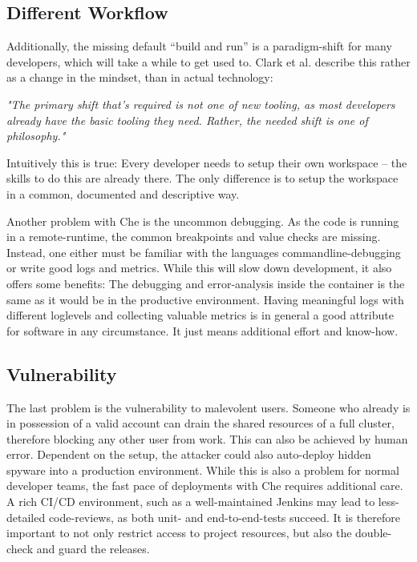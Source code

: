 \documentclass[utf8]{lni}
\begin{document}
\subsection{Different Workflow}
Additionally, the missing default “build and run” is a paradigm-shift for many developers, which will take a while to get used to. 
Clark et al. \cite{CL14} describe this rather as a change in the mindset, than in actual technology: 

\begin{centering}
	\textit{"The primary shift that’s required is not one of new tooling, as most developers already have the basic tooling they need.\newline 
	Rather, the needed shift is one of philosophy."}
\end{centering}

Intuitively this is true: Every developer needs to setup their own workspace – the skills to do this are already there. 
The only difference is to setup the workspace in a common, documented and descriptive way. 

Another problem with Che is the uncommon debugging. 
As the code is running in a remote-runtime, the common breakpoints  and  value checks are missing.  
Instead,  one  either must be familiar with the languages commandline-debugging or write good logs and metrics. 
While this will slow down development, it also offers some benefits: 
The debugging and error-analysis inside the container is the same as it would be in the productive environment. 
Having meaningful logs with different loglevels and collecting valuable metrics is in general a good attribute for software in any circumstance. 
It just means additional effort and know-how.  

\subsection{Vulnerability}
The last problem is the vulnerability to malevolent users. 
Someone who already is in possession of a valid account can drain the shared resources of a full cluster, therefore blocking  any  other  user  from  work.
This  can  also  be achieved by human error. 
Dependent on the setup, the attacker could also auto-deploy hidden spyware into a production environment. 
While this is also a problem for normal developer teams, the fast pace of deployments with Che requires additional care. 
A rich CI/CD environment, such as a well-maintained Jenkins may lead to less-detailed code-reviews, as both unit- and end-to-end-tests succeed.  
It is therefore important to not only restrict access to project resources, but also the double-check and guard the releases.
  
\end{document}
